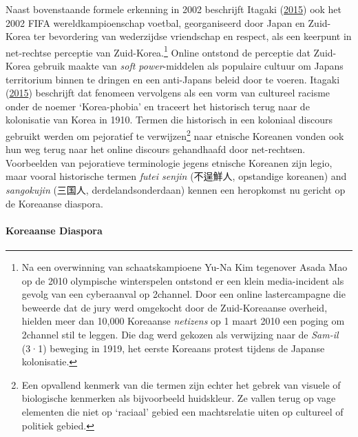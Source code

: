 \documentclass[10.5pt,dutch,]{article}
\let\oldparagraph\paragraph
\renewcommand{\paragraph}[1]{\oldparagraph{#1}\mbox{}}
\begin{document}
Naast bovenstaande formele erkenning in 2002 beschrijft Itagaki
(\protect\hyperlink{ref-itagakiux5fanatomyux5f2015}{2015}) ook het 2002
FIFA wereldkampioenschap voetbal, georganiseerd door Japan en Zuid-Korea
ter bevordering van wederzijdse vriendschap en respect, als een keerpunt
in net-rechtse perceptie van Zuid-Korea.\footnote{Na een overwinning van
  schaatskampioene Yu-Na Kim tegenover Asada Mao op de 2010 olympische
  winterspelen ontstond er een klein media-incident als gevolg van een
  cyberaanval op 2channel. Door een online lastercampagne die beweerde
  dat de jury werd omgekocht door de Zuid-Koreaanse overheid, hielden
  meer dan 10,000 Koreaanse \emph{netizens} op 1 maart 2010 een poging
  om 2channel stil te leggen. Die dag werd gekozen als verwijzing naar
  de \emph{Sam-il} (3·1) beweging in 1919, het eerste Koreaans protest
  tijdens de Japanse kolonisatie.} Online ontstond de perceptie dat
Zuid-Korea gebruik maakte van \emph{soft power}-middelen als populaire
cultuur om Japans territorium binnen te dringen en een anti-Japans
beleid door te voeren. Itagaki
(\protect\hyperlink{ref-itagakiux5fanatomyux5f2015}{2015}) beschrijft
dat fenomeen vervolgens als een vorm van cultureel racisme onder de
noemer `Korea-phobia' en traceert het historisch terug naar de
kolonisatie van Korea in 1910. Termen die historisch in een koloniaal
discours gebruikt werden om pejoratief te verwijzen\footnote{Een
  opvallend kenmerk van die termen zijn echter het gebrek van visuele of
  biologische kenmerken als bijvoorbeeld huidskleur. Ze vallen terug op
  vage elementen die niet op `raciaal' gebied een machtsrelatie uiten op
  cultureel of politiek gebied.} naar etnische Koreanen vonden ook hun
weg terug naar het online discours gehandhaafd door net-rechtsen.
Voorbeelden van pejoratieve terminologie jegens etnische Koreanen zijn
legio, maar vooral historische termen \emph{futei senjin} (不逞鮮人,
opstandige koreanen) and \emph{sangokujin} (三国人, derdelandsonderdaan)
kennen een heropkomst nu gericht op de Koreaanse diaspora.

\paragraph{Koreaanse Diaspora}\label{koreaanse-diaspora}
\end{document}
